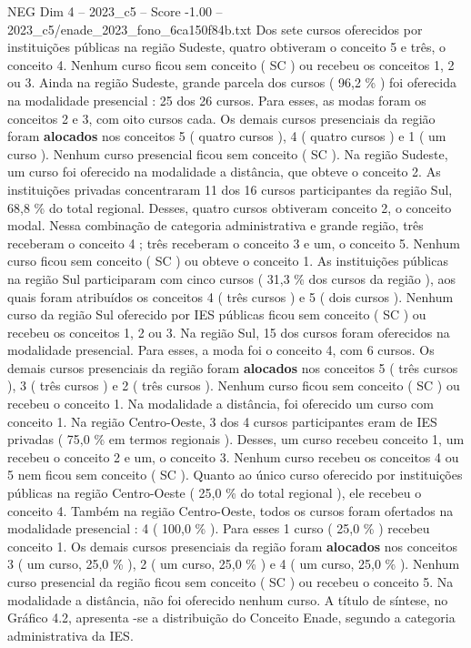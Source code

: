 \begin{textsample}{NEG Dim 4 – 2023\_c5 – Score -1.00 – 2023\_c5/enade\_2023\_fono\_6ca150f84b.txt}
Dos sete cursos oferecidos por instituições públicas na região Sudeste, quatro obtiveram o conceito 5 e três, o conceito 4.
Nenhum curso ficou sem conceito ( SC ) ou recebeu os conceitos 1, 2 ou 3.
Ainda na região Sudeste, grande parcela dos cursos ( 96,2 \% ) foi oferecida na modalidade presencial : 25 dos 26 cursos.
Para esses, as modas foram os conceitos 2 e 3, com oito cursos cada.
Os demais cursos presenciais da região foram \textbf{alocados} nos conceitos 5 ( quatro cursos ), 4 ( quatro cursos ) e 1 ( um curso ).
Nenhum curso presencial ficou sem conceito ( SC ).
Na região Sudeste, um curso foi oferecido na modalidade a distância, que obteve o conceito 2.
As instituições privadas concentraram 11 dos 16 cursos participantes da região Sul, 68,8 \% do total regional.
Desses, quatro cursos obtiveram conceito 2, o conceito modal.
Nessa combinação de categoria administrativa e grande região, três receberam o conceito 4 ; três receberam o conceito 3 e um, o conceito 5.
Nenhum curso ficou sem conceito ( SC ) ou obteve o conceito 1.
As instituições públicas na região Sul participaram com cinco cursos ( 31,3 \% dos cursos da região ), aos quais foram atribuídos os conceitos 4 ( três cursos ) e 5 ( dois cursos ).
Nenhum curso da região Sul oferecido por IES públicas ficou sem conceito ( SC ) ou recebeu os conceitos 1, 2 ou 3.
Na região Sul, 15 dos cursos foram oferecidos na modalidade presencial.
Para esses, a moda foi o conceito 4, com 6 cursos.
Os demais cursos presenciais da região foram \textbf{alocados} nos conceitos 5 ( três cursos ), 3 ( três cursos ) e 2 ( três cursos ).
Nenhum curso ficou sem conceito ( SC ) ou recebeu o conceito 1.
Na modalidade a distância, foi oferecido um curso com conceito 1.
Na região Centro-Oeste, 3 dos 4 cursos participantes eram de IES privadas ( 75,0 \% em termos regionais ).
Desses, um curso recebeu conceito 1, um recebeu o conceito 2 e um, o conceito 3.
Nenhum curso recebeu os conceitos 4 ou 5 nem ficou sem conceito ( SC ).
Quanto ao único curso oferecido por instituições públicas na região Centro-Oeste ( 25,0 \% do total regional ), ele recebeu o conceito 4.
Também na região Centro-Oeste, todos os cursos foram ofertados na modalidade presencial : 4 ( 100,0 \% ).
Para esses 1 curso ( 25,0 \% ) recebeu conceito 1.
Os demais cursos presenciais da região foram \textbf{alocados} nos conceitos 3 ( um curso, 25,0 \% ), 2 ( um curso, 25,0 \% ) e 4 ( um curso, 25,0 \% ).
Nenhum curso presencial da região ficou sem conceito ( SC ) ou recebeu o conceito 5.
Na modalidade a distância, não foi oferecido nenhum curso.
A título de síntese, no Gráfico 4.2, apresenta -se a distribuição do Conceito Enade, segundo a categoria administrativa da IES.

\end{textsample}
